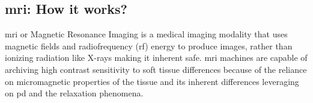 \subsection{\gls{mri}: How it works?}

%
%
%
%
%
%
%




\gls{mri} or Magnetic Resonance Imaging is a medical imaging modality that uses magnetic fields and radiofrequency (\gls{rf}) energy to produce images, rather than ionizing radiation like X-rays making it inherent safe. \gls{mri} machines are capable of archiving high contrast sensitivity to soft tissue differences because of the reliance on micromagnetic properties of the tissue and its inherent differences leveraging on \gls{pd} and the relaxation phenomena.



